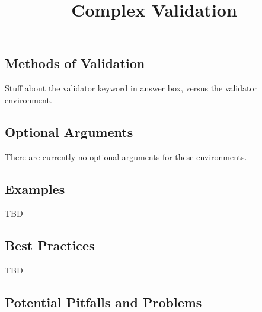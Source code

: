 \documentclass{ximera}
\title{Complex Validation}
\begin{document}
\begin{abstract}
\end{abstract}
\maketitle

    \subsection{Methods of Validation}
        Stuff about the validator keyword in answer box, versus the validator environment.
        
    \subsection*{Optional Arguments}
        There are currently no optional arguments for these environments.

    \subsection*{Examples}
    
        TBD
        
    \subsection*{Best Practices}
    
        TBD
        
    
    \subsection*{Potential Pitfalls and Problems}
    
\end{document}
